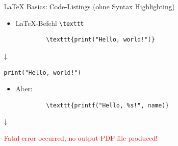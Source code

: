 \documentclass[main.tex]{subfiles}
\begin{document}
\begin{frame}[fragile]{\LaTeX{} Basics: Code-Listings (ohne Syntax Highlighting)}
    \begin{itemize}
        \item \LaTeX-Befehl \verb|\texttt|
    \end{itemize}
    \pause
    \vspace{-10pt}
    \begin{center}
        \begin{verbatim}
            \texttt{print("Hello, world!")}
        \end{verbatim}
        \vspace{-17pt}
        ↓

        \texttt{print("Hello, world!")}
    \end{center}
    \pause
    \vspace{-7pt}
    \begin{itemize}
        \item Aber:
    \end{itemize}
    \pause
    \vspace{-10pt}
    \begin{center}
        \begin{verbatim}
            \texttt{printf("Hello, %s!", name)}
        \end{verbatim}
        \vspace{-17pt}
        ↓

        \textcolor{red}{Fatal error occurred, no output PDF file produced!}
    \end{center}
\end{frame}
\end{document}
